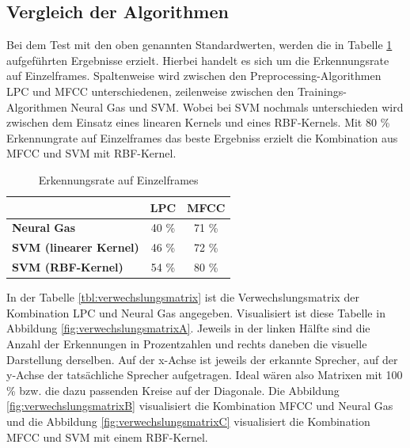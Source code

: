 \subsection{Vergleich der Algorithmen}
Bei dem Test mit den oben genannten Standardwerten, werden die in Tabelle \ref{tbl:vergleich} aufgeführten Ergebnisse erzielt. Hierbei handelt es sich um die Erkennungsrate auf Einzelframes. Spaltenweise wird zwischen den Preprocessing-Algorithmen LPC und MFCC unterschiedenen, zeilenweise zwischen den Trainings-Algorithmen Neural Gas und SVM. Wobei bei SVM nochmals unterschieden wird zwischen dem Einsatz eines linearen Kernels und eines RBF-Kernels. Mit 80 \% Erkennungrate auf Einzelframes das beste Ergebniss erzielt die Kombination aus MFCC und SVM mit RBF-Kernel.

\begin{table}[h]
	\centering
	\begin{tabular}{l|c|c}			
		& \textbf{LPC} & \textbf{MFCC} \\
		\hline
		\textbf{Neural Gas} & 40 \% & 71 \% \\
		\textbf{SVM (linearer Kernel)} & 46 \% & 72 \% \\
		\textbf{SVM (RBF-Kernel)} & 54 \% & 80 \% \\
	\end{tabular}
	\caption{Erkennungsrate auf Einzelframes}
	\label{tbl:vergleich}
\end{table}

In der Tabelle \ref{tbl:verwechslungsmatrix} ist die Verwechslungsmatrix der Kombination LPC und Neural Gas angegeben. Visualisiert ist diese Tabelle in Abbildung \ref{fig:verwechslungsmatrixA}. Jeweils in der linken Hälfte sind die Anzahl der Erkennungen in Prozentzahlen und rechts daneben die visuelle Darstellung derselben. Auf der x-Achse ist jeweils der erkannte Sprecher, auf der y-Achse der tatsächliche Sprecher aufgetragen. Ideal wären also Matrixen mit 100 \% bzw. die dazu passenden Kreise auf der Diagonale. Die Abbildung \ref{fig:verwechslungsmatrixB} visualisiert die Kombination MFCC und Neural Gas und die Abbildung \ref{fig:verwechslungsmatrixC} visualisiert die Kombination MFCC und SVM mit einem RBF-Kernel.

\setlength{\tabcolsep}{6pt} %
\renewcommand{\arraystretch}{1.1} %


